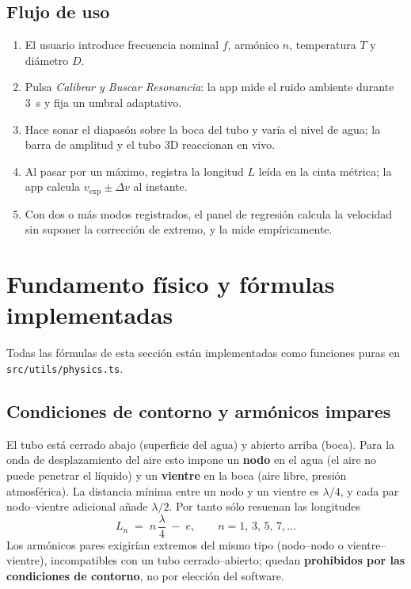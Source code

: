 \documentclass[11pt,a4paper]{article}
\newcommand{\vexp}{v_{\text{exp}}}
\begin{document}
\subsection{Flujo de uso}
\begin{enumerate}[nosep]
  \item El usuario introduce frecuencia nominal $f$, armónico $n$, temperatura $T$ y diámetro $D$.
  \item Pulsa \emph{Calibrar y Buscar Resonancia}: la app mide el ruido ambiente durante
        \SI{3}{\second} y fija un umbral adaptativo.
  \item Hace sonar el diapasón sobre la boca del tubo y varía el nivel de agua; la barra de
        amplitud y el tubo 3D reaccionan en vivo.
  \item Al pasar por un máximo, registra la longitud $L$ leída en la cinta métrica; la app
        calcula $\vexp \pm \Delta v$ al instante.
  \item Con dos o más modos registrados, el panel de regresión calcula la velocidad sin
        suponer la corrección de extremo, y la mide empíricamente.
\end{enumerate}

\section{Fundamento físico y fórmulas implementadas}

Todas las fórmulas de esta sección están implementadas como funciones puras en
\texttt{src/utils/physics.ts}.

\subsection{Condiciones de contorno y armónicos impares}

El tubo está cerrado abajo (superficie del agua) y abierto arriba (boca). Para la onda de
desplazamiento del aire esto impone un \textbf{nodo} en el agua (el aire no puede penetrar el
líquido) y un \textbf{vientre} en la boca (aire libre, presión atmosférica). La distancia
mínima entre un nodo y un vientre es $\lambda/4$, y cada par nodo--vientre adicional añade
$\lambda/2$. Por tanto sólo resuenan las longitudes
\begin{equation}
  L_n \;=\; n\,\frac{\lambda}{4} \;-\; e,
  \qquad n = 1,\,3,\,5,\,7,\dots
  \label{eq:Ln}
\end{equation}
Los armónicos pares exigirían extremos del mismo tipo (nodo--nodo o vientre--vientre),
incompatibles con un tubo cerrado--abierto; quedan \textbf{prohibidos por las condiciones de
contorno}, no por elección del software.
\end{document}
